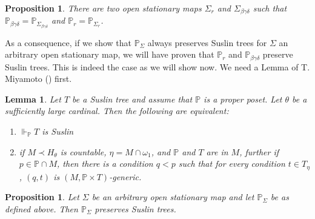 \documentclass[a4paper,11pt]{article}
\newtheorem{lemma}[theorem]{Lemma}
\newtheorem{proposition}[theorem]{Proposition}
\newcommand{\forceP}{\mathbb{P}}
\begin{document}
\begin{proposition}\label{MRPpreservesSuslin}
There are two open stationary maps $\Sigma_r$ and $\Sigma_{\beta \gamma \delta}$ such that $\forceP_{\beta \gamma \delta} = \forceP_{\Sigma_{\beta \gamma \delta}}$ and $\forceP_r = \forceP_{\Sigma_r}$.
\end{proposition}
As a consequence, if we show that $\forceP_{\Sigma}$ always preserves Suslin trees for $\Sigma$ an arbitrary open stationary map, we will have proven that $\forceP_r$ and $\forceP_{\beta \gamma \delta}$ preserve Suslin trees. This is indeed the case as we will show now. We need a Lemma of T. Miyamoto (\cite{Miyamoto}) first. 
\begin{lemma}\label{preservation of Suslin trees}
 Let $T$ be a Suslin tree and assume that $\forceP$ is a proper
 poset. Let $\theta$ be a sufficiently large cardinal.
 Then the following are equivalent:
 \begin{enumerate}
  \item $\Vdash_{\forceP} T$ is Suslin
 
  \item if $M \prec H_{\theta}$ is countable, $\eta = M \cap \omega_1$, and $\forceP$ and $T$ are in $M$,
  further if $p \in \forceP \cap M$, then there is a condition $q<p$ such that 
  for every condition $t \in T_{\eta}$, 
  $(q,t)$ is $(M, \forceP \times T)$-generic.
 \end{enumerate}

\end{lemma}




\begin{proposition}\label{PFAMRP}
Let $\Sigma$ be an arbitrary open stationary map and let $\forceP_{\Sigma}$ be as defined above. Then $\forceP_{\Sigma}$ preserves Suslin trees.
\end{proposition}
\end{document}
